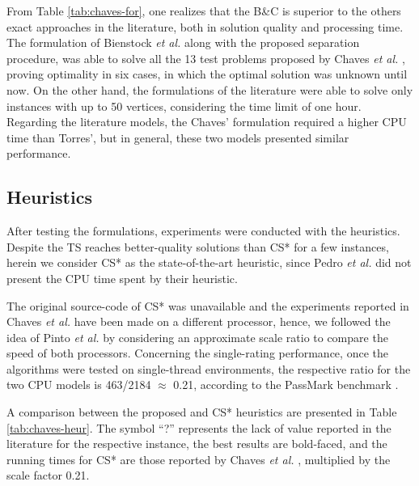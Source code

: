 \documentclass{ro}
\begin{document}
From Table \ref{tab:chaves-for}, one realizes that the B\&C is superior to the others exact approaches in the literature, both in solution quality and processing time. The formulation of Bienstock \textit{et al.} \cite{bienstock1993note} along with the proposed separation procedure, was able to solve all the 13 test problems proposed by Chaves \textit{et al.} \cite{chaves2005hybrid}, proving optimality in six cases, in which the optimal solution was unknown until now. On the other hand, the formulations of the literature were able to solve only instances with up to 50 vertices, considering the time limit of one hour. Regarding the literature models, the Chaves' formulation required a higher CPU time than Torres', but in general, these two models presented similar performance.



\subsection{Heuristics}

After testing the formulations, experiments were conducted with the heuristics. Despite the TS reaches better-quality solutions than CS* for a few instances, herein we consider CS* as the state-of-the-art heuristic, since Pedro \textit{et al.} \cite{pedro2013tabu} did not present the CPU time spent by their heuristic.




The original source-code of CS* was unavailable and the experiments reported in Chaves \textit{et al.}\cite{chaves2005hybrid} have been made on a different processor, hence, we followed the idea of Pinto \textit{et al.} \cite{PINTO2018849} by considering an approximate scale ratio to compare the speed of both
processors. Concerning the single-rating performance, once the algorithms were tested on single-thread environments, the respective ratio for the two CPU models is 463/2184 $\approx$ 0.21, according to the PassMark benchmark \cite{passmark}.

A comparison between the proposed and CS* heuristics are presented in Table  \ref{tab:chaves-heur}. The symbol ``?'' represents the lack of value reported in the literature for the respective instance,  the best results are bold-faced, and the running times for CS* are those reported by Chaves \textit{et al.} \cite{chaves2005hybrid}, multiplied by the scale factor 0.21.
\end{document}
